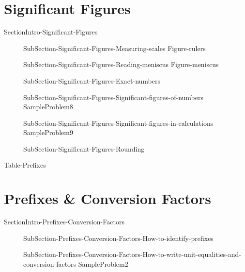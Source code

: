 \documentclass[main.tex]{subfiles}
\newcommand\chapterlabel{Ch-measurements}\setcounter{figurenewcounter}{0}\setcounter{tablenewcounter}{0}\setcounter{formulanewcounter}{0}\chapterpicture{../{\chapterlabel}/figure1}\chapterpicturelabel{PngImg}
\begin{document}
\section{Significant Figures}
{SectionIntro-Significant-Figures}
 \sloppy\begin{description}
  \item[]{SubSection-Significant-Figures-Measuring-scales}
{Figure-rulers}
\item[]{SubSection-Significant-Figures-Reading-meniscus}
{Figure-meniscus}
 \item[]{SubSection-Significant-Figures-Exact-numbers}

\item[]{SubSection-Significant-Figures-Significant-figures-of-numbers}
{SampleProblem8}%
\item[]{SubSection-Significant-Figures-Significant-figures-in-calculations}
{SampleProblem9}%
 \item[]{SubSection-Significant-Figures-Rounding}
\end{description}

{Table-Prefixes}
\section{Prefixes \& Conversion Factors}
{SectionIntro-Prefixes-Conversion-Factors}
\sloppy\begin{description}
\item[]{SubSection-Prefixes-Conversion-Factors-How-to-identify-prefixes}
\item[]{SubSection-Prefixes-Conversion-Factors-How-to-write-unit-equalities-and-conversion-factors}
{SampleProblem2}%
\end{description}
\end{document}
